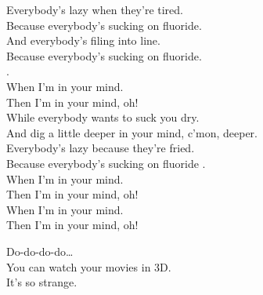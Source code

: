 
\label{album:im-in-your-mind-fuzz}





Everybody's lazy when they're tired. \\
Because everybody's sucking on fluoride. \\
And everybody's filing into line. \\
Because everybody's sucking on fluoride. \\. \\

When I'm in your mind. \\
Then I'm in your mind, oh! \\

While everybody wants to suck you dry. \\
And dig a little deeper in your mind, c'mon, deeper. \\
Everybody's lazy because they're fried. \\
Because everybody's sucking on fluoride . \\

When I'm in your mind. \\
Then I'm in your mind, oh! \\
When I'm in your mind. \\
Then I'm in your mind, oh! \\









Do-do-do-do… \\

You can watch your movies in 3D. \\
It's so strange. \\

